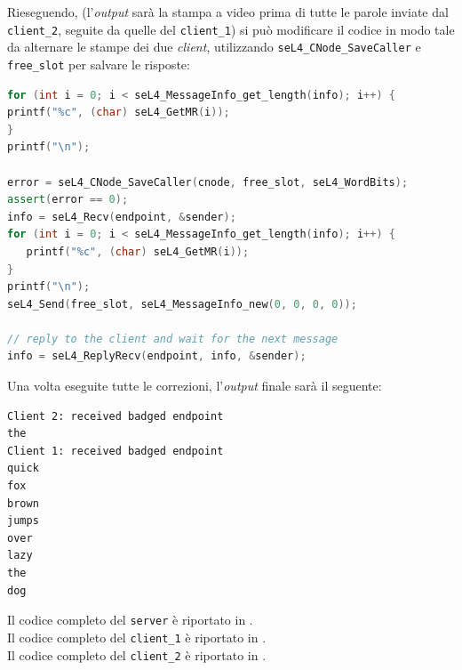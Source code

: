 Rieseguendo, (l'\textit{output} sarà la stampa a video prima di tutte le parole inviate dal \texttt{client\_2}, seguite da quelle del \texttt{client\_1}) si può modificare il codice in modo tale da alternare le stampe dei due \textit{client}, utilizzando \texttt{seL4\_CNode\_SaveCaller} e \texttt{free\_slot} per salvare le risposte:
\begin{lstlisting}[language=C++]
for (int i = 0; i < seL4_MessageInfo_get_length(info); i++) {
printf("%c", (char) seL4_GetMR(i));
}
printf("\n");

error = seL4_CNode_SaveCaller(cnode, free_slot, seL4_WordBits);
assert(error == 0);
info = seL4_Recv(endpoint, &sender);
for (int i = 0; i < seL4_MessageInfo_get_length(info); i++) {
   printf("%c", (char) seL4_GetMR(i));
}
printf("\n");
seL4_Send(free_slot, seL4_MessageInfo_new(0, 0, 0, 0));

// reply to the client and wait for the next message
info = seL4_ReplyRecv(endpoint, info, &sender);
\end{lstlisting}

Una volta eseguite tutte le correzioni, l'\textit{output} finale sarà il seguente:
\begin{lstlisting}[language=bash]
Client 2: received badged endpoint
the
Client 1: received badged endpoint
quick
fox
brown
jumps
over
lazy
the
dog
\end{lstlisting}
Il codice completo del \texttt{server} è riportato in \cite{IPCserver}.\\
Il codice completo del \texttt{client\_1} è riportato in \cite{IPCclient1}.\\
Il codice completo del \texttt{client\_2} è riportato in \cite{IPCclient2}.